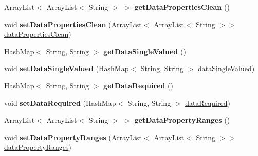 \begin{DoxyCompactItemize}
\item 
\hypertarget{class_data_base_1_1_tables_aa9ea262b8d7d65909acdd07699d743b0}{
ArrayList$<$ ArrayList$<$ String $>$ $>$ {\bfseries getDataPropertiesClean} ()}
\label{class_data_base_1_1_tables_aa9ea262b8d7d65909acdd07699d743b0}

\item 
\hypertarget{class_data_base_1_1_tables_ae3c5c0926fd770b2b0282ade507fc51e}{
void {\bfseries setDataPropertiesClean} (ArrayList$<$ ArrayList$<$ String $>$$>$ \hyperlink{class_data_base_1_1_tables_af9e966f29b9024df669c77cc0d767c78}{dataPropertiesClean})}
\label{class_data_base_1_1_tables_ae3c5c0926fd770b2b0282ade507fc51e}

\item 
\hypertarget{class_data_base_1_1_tables_ad6dba497a4d71b713fe5c09ea7fffb29}{
HashMap$<$ String, String $>$ {\bfseries getDataSingleValued} ()}
\label{class_data_base_1_1_tables_ad6dba497a4d71b713fe5c09ea7fffb29}

\item 
\hypertarget{class_data_base_1_1_tables_a8a821de16bc3106812b561748f2d0e7e}{
void {\bfseries setDataSingleValued} (HashMap$<$ String, String $>$ \hyperlink{class_data_base_1_1_tables_a40e2a6f8f60048f0a393e9d03e8fcfd8}{dataSingleValued})}
\label{class_data_base_1_1_tables_a8a821de16bc3106812b561748f2d0e7e}

\item 
\hypertarget{class_data_base_1_1_tables_a4d7111a9066de5419b44d10619e5fc65}{
HashMap$<$ String, String $>$ {\bfseries getDataRequired} ()}
\label{class_data_base_1_1_tables_a4d7111a9066de5419b44d10619e5fc65}

\item 
\hypertarget{class_data_base_1_1_tables_acc961989faf4e25f8391d92b5ea8d620}{
void {\bfseries setDataRequired} (HashMap$<$ String, String $>$ \hyperlink{class_data_base_1_1_tables_af968a71b80946ad236d287dad7a68774}{dataRequired})}
\label{class_data_base_1_1_tables_acc961989faf4e25f8391d92b5ea8d620}

\item 
\hypertarget{class_data_base_1_1_tables_a6fd83e3450cb0ec3a16db078b1c3f5a3}{
ArrayList$<$ ArrayList$<$ String $>$ $>$ {\bfseries getDataPropertyRanges} ()}
\label{class_data_base_1_1_tables_a6fd83e3450cb0ec3a16db078b1c3f5a3}

\item 
\hypertarget{class_data_base_1_1_tables_a2966ba30db9ec5fa6be2d84a25a6d150}{
void {\bfseries setDataPropertyRanges} (ArrayList$<$ ArrayList$<$ String $>$$>$ \hyperlink{class_data_base_1_1_tables_ac4fac81e62e9331f412a2ede3ddcc502}{dataPropertyRanges})}
\label{class_data_base_1_1_tables_a2966ba30db9ec5fa6be2d84a25a6d150}


\end{DoxyCompactItemize}
